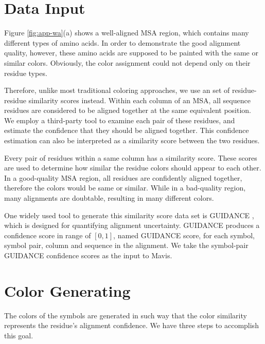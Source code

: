 \section{Data Input}

Figure \ref{fig:app-wa}(a) shows a well-aligned MSA region, which contains many different types of amino acids. In order to demonstrate the good alignment quality, however, these amino acids are supposed to be painted with the same or similar colors. Obviously, the color assignment could not depend only on their residue types.

Therefore, unlike most traditional coloring approaches, we use an set of residue-residue similarity scores instead. Within each column of an MSA, all sequence residues are considered to be aligned together at the same equivalent position. We employ a third-party tool to examine each pair of these residues, and estimate the confidence that they should be aligned together. This confidence estimation can also be interpreted as a similarity score between the two residues.

Every pair of residues within a same column has a similarity score. These scores are used to determine how similar the residue colors should appear to each other. In a good-quality MSA region, all residues are confidently aligned together, therefore the colors would be same or similar. While in a bad-quality region, many alignments are doubtable, resulting in many different colors.

One widely used tool to generate this similarity score data set is GUIDANCE \cite{Penn:2010aa,Penn:2010ab}, which is designed for quantifying alignment uncertainty. GUIDANCE produces a confidence score in range of $[0, 1]$, named GUIDANCE score, for each symbol, symbol pair, column and sequence in the alignment. We take the symbol-pair GUIDANCE confidence scores as the input to Mavis.

\section{Color Generating}

The colors of the symbols are generated in such way that the color similarity represents the residue's alignment confidence. We have three steps to accomplish this goal.


